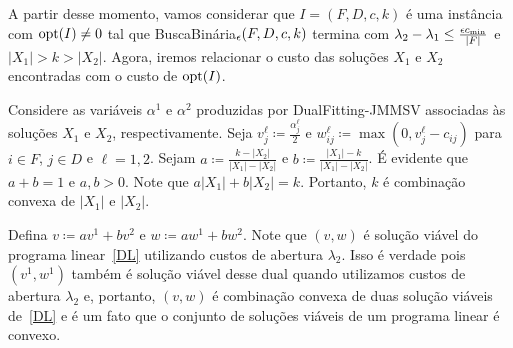 A partir desse momento, vamos considerar que $I = (F,D,c,k)$ é uma instância com $\mathrm{opt}(I) \neq 0$ tal que {\sc BuscaBinária$_\epsilon(F,D,c,k)$} termina com $\lambda_2 - \lambda_1 \leq \frac{\epsilon c_\text{min}}{|F|}$ e $|X_1| > k > |X_2|$.
Agora, iremos relacionar o custo das soluções $X_1$ e $X_2$ encontradas com o custo de $\mathrm{opt}(I)$.

Considere as variáveis $\alpha^1$ e $\alpha^2$ produzidas por {\sc DualFitting-JMMSV} associadas às soluções $X_1$ e $X_2$, respectivamente. Seja $v_j^\ell \coloneqq \frac{\alpha_j^\ell}{2}$ e $w_{ij}^\ell \coloneqq \max(0,v_j^\ell - c_{ij})$ para $i \in F$, $j \in D$ e $\ell = 1,2$. Sejam $a \coloneqq \frac{k - |X_2|}{|X_1| - |X_2|}$ e $b \coloneqq \frac{|X_1| - k}{|X_1| - |X_2|}$. É evidente que $a + b = 1$ e $a,b >0$. Note que $a|X_1| + b |X_2| = k$. Portanto, $k$ é combinação convexa de $|X_1|$ e $|X_2|$.

Defina $ v \coloneqq av^1 + bv^2$ e $w \coloneqq aw^1 + bw^2$. Note que $(v,w)$ é solução viável do programa linear~\eqref{DL} utilizando custos de abertura $\lambda_2$. Isso é verdade pois $(v^1,w^1)$ também é solução viável desse dual quando utilizamos custos de abertura $\lambda_2$ e, portanto, $(v,w)$ é combinação convexa de duas solução viáveis de~\eqref{DL} e é um fato que o conjunto de soluções viáveis de um programa linear é convexo.



